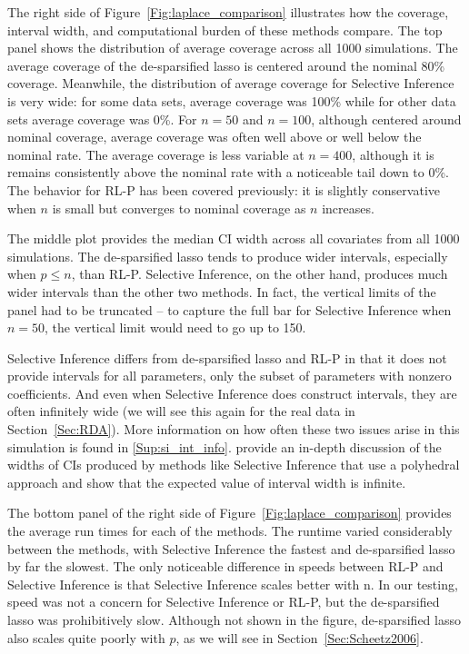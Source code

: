 The right side of Figure~\ref{Fig:laplace_comparison} illustrates how the coverage, interval width, and computational burden of these methods compare. The top panel shows the distribution of average coverage across all 1000 simulations. The average coverage of the de-sparsified lasso is centered around the nominal 80\% coverage. Meanwhile, the distribution of average coverage for Selective Inference is very wide: for some data sets, average coverage was 100\% while for other data sets average coverage was 0\%. For $n = 50$ and $n = 100$, although centered around nominal coverage, average coverage was often well above or well below the nominal rate. The average coverage is less variable at $n = 400$, although it is remains consistently above the nominal rate with a noticeable tail down to 0\%. The behavior for RL-P has been covered previously: it is slightly conservative when $n$ is small but converges to nominal coverage as $n$ increases.

The middle plot provides the median CI width across all covariates from all 1000 simulations. The de-sparsified lasso tends to produce wider intervals, especially when $p \le n$, than RL-P. Selective Inference, on the other hand, produces much wider intervals than the other two methods. In fact, the vertical limits of the panel had to be truncated -- to capture the full bar for Selective Inference when $n = 50$, the vertical limit would need to go up to 150.

Selective Inference differs from de-sparsified lasso and RL-P in that it does not provide intervals for all parameters, only the subset of parameters with nonzero coefficients. And even when Selective Inference does construct intervals, they are often infinitely wide (we will see this again for the real data in Section~\ref{Sec:RDA}). More information on how often these two issues arise in this simulation is found in \ref{Sup:si_int_info}. \citet{Kivaranovic2021} provide an in-depth discussion of the widths of CIs produced by methods like Selective Inference that use a polyhedral approach and show that the expected value of interval width is infinite.

The bottom panel of the right side of Figure~\ref{Fig:laplace_comparison} provides the average run times for each of the methods. The runtime varied considerably between the methods, with Selective Inference the fastest and de-sparsified lasso by far the slowest.  The only noticeable difference in speeds between RL-P and Selective Inference is that Selective Inference scales better with n. In our testing, speed was not a concern for Selective Inference or RL-P, but the de-sparsified lasso was prohibitively slow. Although not shown in the figure, de-sparsified lasso also scales quite poorly with $p$, as we will see in Section~\ref{Sec:Scheetz2006}.

